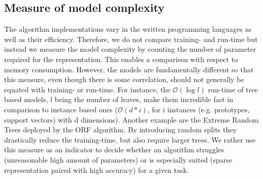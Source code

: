\documentclass{esann}
\begin{document}
\subsection{Measure of model complexity}
The algorithm implementations vary in the written programming languages as well as their efficiency. Therefore, we do not compare training- and run-time but instead we measure the model complexity
by counting the number of parameter required for the representation. This enables a comparison with respect to memory consumption. 
However, the models are fundamentally different so that this measure, even though there is some correlation, should not generally be equated with training- or run-time.
For instance, the $\mathcal{O}(\log l)$ run-time of tree based models, l being the number of leaves, make them incredible fast in comparison to instance based ones ($\mathcal{O}(d*i)$, for i
instances (e.g. prototypes, support vectors) with d dimensions).
Another example are the Extreme Random Trees deployed by the ORF algorithm. By introducing random splits they drastically reduce the training-time, but also require larger trees\cite{ert}.
We rather use this measure as an indicator to decide whether an algorithm struggles (unreasonable high amount of parameters) or is especially suited (sparse representation paired with high accuracy) for a given task. 
\end{document}

